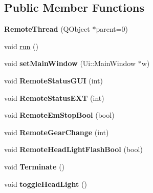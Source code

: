 \subsection*{Public Member Functions}
\begin{DoxyCompactItemize}
\item 
\hypertarget{class_remote_thread_a1acb4cb43462156d6b9177bcb1e1dfb1}{}{\bfseries Remote\+Thread} (Q\+Object $\ast$parent=0)\label{class_remote_thread_a1acb4cb43462156d6b9177bcb1e1dfb1}

\item 
void \hyperlink{class_remote_thread_afaaf517a8ecef88feeaa477ac84da127}{run} ()
\item 
\hypertarget{class_remote_thread_ac14ef5fec27c7c93e26b59445d3eff1e}{}void {\bfseries set\+Main\+Window} (Ui\+::\+Main\+Window $\ast$w)\label{class_remote_thread_ac14ef5fec27c7c93e26b59445d3eff1e}

\item 
\hypertarget{class_remote_thread_a8da88adbd10488157ce7c634fd150f3d}{}void {\bfseries Remote\+Status\+G\+U\+I} (int)\label{class_remote_thread_a8da88adbd10488157ce7c634fd150f3d}

\item 
\hypertarget{class_remote_thread_a7eb9019a150eba70aef59e978817ac36}{}void {\bfseries Remote\+Status\+E\+X\+T} (int)\label{class_remote_thread_a7eb9019a150eba70aef59e978817ac36}

\item 
\hypertarget{class_remote_thread_a2903df0c063123c45d22d97dd55f76fa}{}void {\bfseries Remote\+Em\+Stop\+Bool} (bool)\label{class_remote_thread_a2903df0c063123c45d22d97dd55f76fa}

\item 
\hypertarget{class_remote_thread_a4dc74280db042b990cbb960b7610fa89}{}void {\bfseries Remote\+Gear\+Change} (int)\label{class_remote_thread_a4dc74280db042b990cbb960b7610fa89}

\item 
\hypertarget{class_remote_thread_af124b02a085e979b77db074994c0495b}{}void {\bfseries Remote\+Head\+Light\+Flash\+Bool} (bool)\label{class_remote_thread_af124b02a085e979b77db074994c0495b}

\item 
\hypertarget{class_remote_thread_a230a67afa07fe8ded962803751ff0acb}{}void {\bfseries Terminate} ()\label{class_remote_thread_a230a67afa07fe8ded962803751ff0acb}

\item 
\hypertarget{class_remote_thread_ac2f9c11acf7383bc97c0643ff76ac195}{}void {\bfseries toggle\+Head\+Light} ()\label{class_remote_thread_ac2f9c11acf7383bc97c0643ff76ac195}


\end{DoxyCompactItemize}
